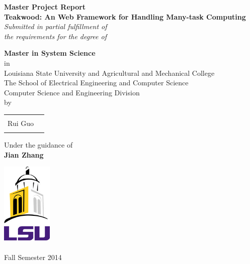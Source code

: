 \begin{titlepage}

\begin{center}

\textup{\bf Master Project Report} \\[0.2in]

\Large \textbf {Teakwood: An Web Framework for Handling Many-task Computing}\\[0.5in]

       \small \emph{Submitted in partial fulfillment of\\
        the requirements for the degree of}
        \vspace{.2in}

       {\bf Master in System Science} \\in\\Louisiana State University and Agricultural and Mechanical College\\ The School of Electrical Engineering and Computer Science\\
Computer Science and Engineering Division\\[0.5in]

\normalsize by \\
\begin{table}[h]
\centering
\begin{tabular}{lr}\hline \\
Rui Guo \\ \\ \hline
 
\end{tabular}
\end{table}

\vspace{.1in}
Under the guidance of\\
{\textbf{Jian Zhang}}\\[0.2in]

\vfill



\includegraphics[width=0.18\textwidth]{./nitc-logo}\\[0.1in]
\\
Fall Semester 2014

\end{center}
\end{titlepage}
